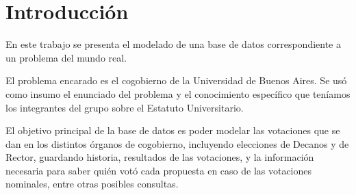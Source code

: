 \section{Introducción}
En este trabajo se presenta el modelado de una base de datos correspondiente a un problema del mundo real.

El problema encarado es el cogobierno de la Universidad de Buenos Aires. Se usó como insumo el enunciado del problema y el conocimiento específico que teníamos los integrantes del grupo sobre el Estatuto Universitario.

El objetivo principal de la base de datos es poder modelar las votaciones que se dan en los distintos órganos de cogobierno, incluyendo elecciones de Decanos y de Rector, guardando historia, resultados de las votaciones, y la información necesaria para saber quién votó cada propuesta en caso de las votaciones nominales, entre otras posibles consultas.